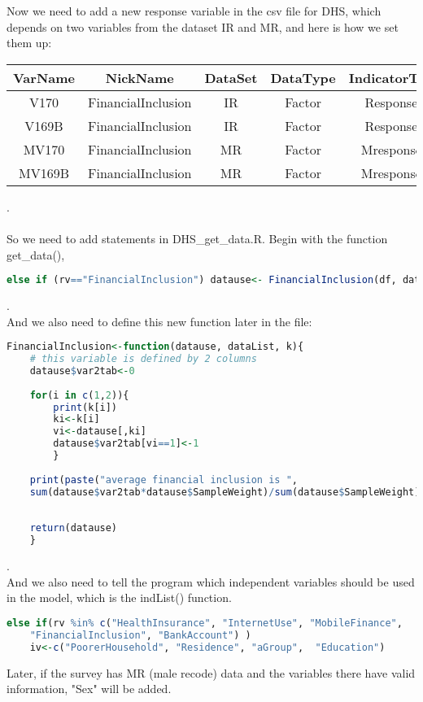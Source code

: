 \documentclass[12pt]{article}
\begin{document}
Now we need to add a new response variable in the csv file for DHS, which depends on two variables from the dataset IR and MR, and here is how we set them up:

{\small 
	\begin{tabular}{|c|c|c|c|c|}
		\hline
VarName & NickName & DataSet & DataType & IndicatorType\\
\hline
V170 & FinancialInclusion & IR & Factor & ResponseV \\
V169B & FinancialInclusion & IR & Factor & ResponseV \\
MV170 & FinancialInclusion & MR & Factor & MresponseV \\
MV169B & FinancialInclusion & MR & Factor & MresponseV \\
\hline
	\end{tabular}
}

.
\\
\\
So we need to add statements in DHS\_get\_data.R. Begin with the function get\_data(), 
{\small 
	\begin{lstlisting}[language=R]
else if (rv=="FinancialInclusion") datause<- FinancialInclusion(df, dataList, k)
	\end{lstlisting}
}
.
\\
And we also need to define this new function later in the file:
 {\small 
	\begin{lstlisting}[language=R]
	FinancialInclusion<-function(datause, dataList, k){
	# this variable is defined by 2 columns
	datause$var2tab<-0
			
	for(i in c(1,2)){
		print(k[i])
		ki<-k[i]
		vi<-datause[,ki]
		datause$var2tab[vi==1]<-1
		}
			
	print(paste("average financial inclusion is ", 
	sum(datause$var2tab*datause$SampleWeight)/sum(datause$SampleWeight)))
			
			
	return(datause)
	}
	\end{lstlisting}
}
.
\\
And we also need to tell the program which independent variables should be used in the model, which is the indList() function.
{\small 
	\begin{lstlisting}[language=R]
 else if(rv %in% c("HealthInsurance", "InternetUse", "MobileFinance", 
    "FinancialInclusion", "BankAccount") )
    iv<-c("PoorerHousehold", "Residence", "aGroup",  "Education")
	\end{lstlisting}
}
Later, if the survey has MR (male recode) data and the variables there have valid information, "Sex" will be added.
\\
\end{document}

